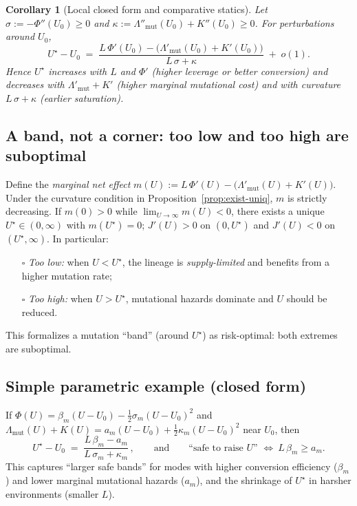 \documentclass[11pt]{article}
\theoremstyle{upright}
\newtheorem{corollary}{Corollary}
\begin{document}
\begin{corollary}[Local closed form and comparative statics]
\label{cor:local}
Let \(\sigma:=-\Phi''(U_0)\ge 0\) and \(\kappa:=\Lambda''_{\mathrm{mut}}(U_0)+K''(U_0)\ge 0\).
For perturbations around \(U_0\),
\[
U^\star-U_0 \;=\; \frac{L\,\Phi'(U_0)-\big(\Lambda'_{\mathrm{mut}}(U_0)+K'(U_0)\big)}{L\,\sigma+\kappa}\;+\;o(1).
\]
Hence \(U^\star\) increases with \(L\) and \(\Phi'\) (higher leverage or better conversion) and decreases with
\(\Lambda'_{\mathrm{mut}}+K'\) (higher marginal mutational cost) and with curvature \(L\,\sigma+\kappa\) (earlier saturation).
\end{corollary}

\subsection{A band, not a corner: too low and too high are suboptimal}
Define the \emph{marginal net effect} \(m(U):=L\,\Phi'(U)-\big(\Lambda'_{\mathrm{mut}}(U)+K'(U)\big)\).
Under the curvature condition in Proposition~\ref{prop:exist-uniq}, \(m\) is strictly decreasing. If \(m(0)>0\) while
\(\lim_{U\to\infty}m(U)<0\), there exists a unique \(U^\star\in(0,\infty)\) with \(m(U^\star)=0\);
\(J'(U)>0\) on \((0,U^\star)\) and \(J'(U)<0\) on \((U^\star,\infty)\). In particular:
\begin{itemize}
\item[$\square$] \emph{Too low:} when \(U<U^\star\), the lineage is \emph{supply-limited} and benefits from a higher mutation rate;
\item[$\square$] \emph{Too high:} when \(U>U^\star\), mutational hazards dominate and \(U\) should be reduced.
\end{itemize}
This formalizes a mutation ``band'' (around \(U^\star\)) as risk-optimal: both extremes are suboptimal.

\subsection{Simple parametric example (closed form)}
If \(\Phi(U)=\beta_m (U-U_0)-\tfrac12 \sigma_m (U-U_0)^2\) and
\(\Lambda_{\mathrm{mut}}(U)+K(U)= a_m (U-U_0)+\tfrac12 \kappa_m (U-U_0)^2\) near \(U_0\), then
\begin{equation}
U^\star-U_0 \;=\; \frac{L\,\beta_m - a_m}{L\,\sigma_m + \kappa_m}\,,
\qquad\text{and}\qquad
\text{``safe to raise \(U\)'' }\Longleftrightarrow\ L\,\beta_m \ge a_m.
\label{eq:Ustar-local}
\end{equation}
This captures ``larger safe bands'' for modes with higher conversion efficiency (\(\beta_m\)) and lower marginal mutational
hazards (\(a_m\)), and the shrinkage of \(U^\star\) in harsher environments (smaller \(L\)).
\end{document}
